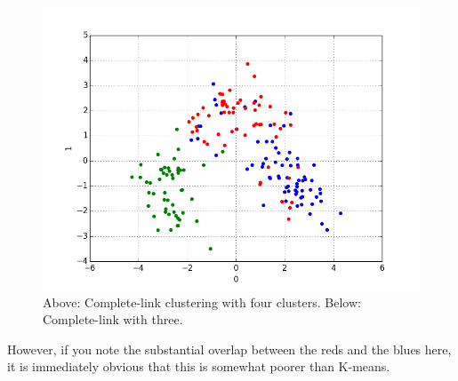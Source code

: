 \documentclass{article}
\begin{document}
\begin{enumerate}
\begin{figure}[H]
			\caption{Above: Complete-link clustering with four clusters. Below: Complete-link with three.}
			\includegraphics[scale=0.5]{HW6complete3.png}
		\end{figure}
		However, if you note the substantial overlap between the reds and the blues here, it is immediately obvious that this is somewhat poorer than K-means.
		\end{enumerate}
	
\end{document}
